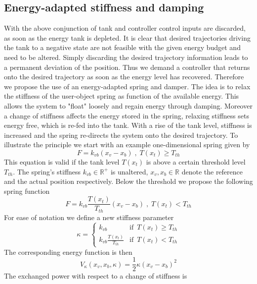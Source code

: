 \documentclass[a4paper,twoside, openright,12pt]{report}
\begin{document}
 
\subsection{Energy-adapted stiffness and damping}\label{SS:EnergyAdaptedStiffness}
With the above conjunction of tank and controller control inputs are discarded, as soon as the energy tank is depleted. It is clear that desired trajectories driving the tank to a negative state are not feasible with the given energy budget and need to be altered. Simply discarding the desired trajectory information leads to a permanent deviation of the position. Thus we demand a controller that returns onto the desired trajectory as soon as the energy level has recovered. Therefore we propose the use of an energy-adapted spring and damper. The idea is to relax the stiffness of the user-object spring as function of the available energy. This allows the system to "float" loosely and regain energy through damping. Moreover a change of stiffness affects the energy stored in the spring, relaxing stiffness sets energy free, which is re-fed into the tank. With a rise of the tank level, stiffness is increased and the spring re-directs the system onto the desired trajectory. To illustrate the principle we start with an example one-dimensional spring given by
\begin{equation}
F = k_{vb}(x_v-x_b) \;,\; T(x_t)\geq T_{th}
\end{equation}
This equation is valid if the tank level $T(x_t)$ is above a certain threshold level $T_{th}$. The spring's stiffness $k_{vb} \in \mathbb{R}^+$ is unaltered, $x_v, x_b \in \mathbb{R}$ denote the reference and the actual position respectively. Below the threshold we propose the following spring function
\begin{equation}
F = k_{vb}\frac{T(x_t)}{T_{th}}(x_v-x_b) \;,\; T(x_t)<T_{th}
\end{equation}
For ease of notation we define a new stiffness parameter
\begin{equation}
\kappa = \begin{cases}
k_{vb} & \text{if } \, T(x_t)\geq T_{th} \\
k_{vb} \frac{T(x_t)}{T_{th}} & \text{if } \, T(x_t) < T_{th}
\end{cases}
\end{equation}
The corresponding energy function is then
\begin{equation}
V_{\kappa}(x_v,x_b,\kappa) = \frac{1}{2} \kappa (x_v-x_b)^2
\end{equation}    
The exchanged power with respect to a change of stiffness is 
\end{document}
